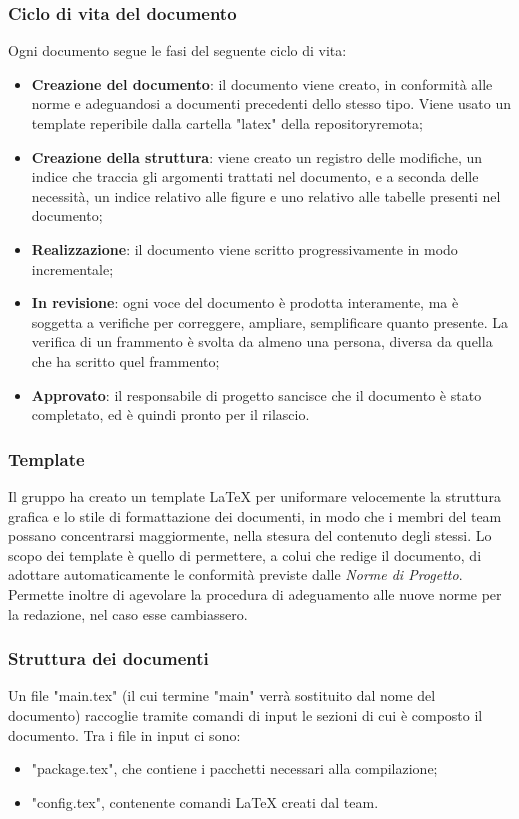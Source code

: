 	\subsubsection{Ciclo di vita del documento}
	Ogni documento segue le fasi del seguente ciclo di vita:
	\begin{itemize}
		\item \textbf{Creazione del documento}: il documento viene creato, in conformità alle norme e adeguandosi a documenti precedenti dello stesso tipo.
		Viene usato un template reperibile dalla cartella "latex" della repository\glosp remota;
		\item \textbf{Creazione della struttura}: viene creato un registro delle modifiche, un indice che traccia gli argomenti trattati nel documento, e a seconda delle necessità, un indice relativo alle figure e uno relativo alle tabelle presenti nel documento;
		\item \textbf{Realizzazione}: il documento viene scritto progressivamente in modo incrementale;
		\item \textbf{In revisione}: ogni voce del documento è prodotta interamente, ma è soggetta a verifiche per correggere, ampliare, semplificare quanto presente. La verifica di un frammento è svolta da almeno una persona, diversa da quella che ha scritto quel frammento;
		\item \textbf{Approvato}: il responsabile di progetto sancisce che il documento è stato completato, ed è quindi pronto per il rilascio.
	\end{itemize}

	\subsubsection{Template}
	Il gruppo ha creato un template \LaTeX{} per uniformare velocemente la struttura grafica e lo stile di formattazione dei documenti, in modo che i membri del team possano concentrarsi maggiormente, nella stesura del contenuto degli stessi. Lo scopo dei template è quello di permettere, a colui che redige il documento, di adottare automaticamente le conformità previste dalle \textit{Norme di Progetto}. Permette inoltre di agevolare la procedura di adeguamento alle nuove norme per la redazione, nel caso esse cambiassero.
	\subsubsection{Struttura dei documenti}
	Un file "main.tex" (il cui termine "main" verrà sostituito dal nome del documento) raccoglie tramite comandi di input le sezioni di cui è composto il documento. Tra i file in input ci sono:
	\begin{itemize}
		\item "package.tex", che contiene i pacchetti necessari alla compilazione;
		\item "config.tex", contenente comandi \LaTeX{} creati dal team.
	\end{itemize}
